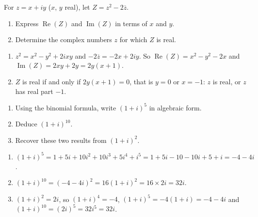 \begin{exercise}
For $z=x+iy$ ($x$, $y$ real), let $Z=z^2-2\overline z$.
\begin{enumerate}
\item Express $\operatorname{Re}(Z)$ and $\operatorname{Im}(Z)$ in terms of $x$ and $y$.
\item Determine the complex numbers $z$ for which $Z$ is real.
\end{enumerate}
\end{exercise}
\begin{solution}
\begin{enumerate}
\item $z^2=x^2-y^2+2ixy$ and $-2\overline z=-2x+2iy$. So $\operatorname{Re}(Z)=x^2-y^2-2x$ and $\operatorname{Im}(Z)=2xy+2y=2y(x+1)$.
\item $Z$ is real if and only if $2y(x+1)=0$, that is $y=0$ or $x=-1$: $z$ is real, or $z$ has real part $-1$.
\end{enumerate}
\end{solution}

\begin{exercise}
\begin{enumerate}
\item Using the binomial formula, write $(1+i)^5$ in algebraic form.
\item Deduce $(1+i)^{10}$.
\item Recover these two results from $(1+i)^2$.
\end{enumerate}
\end{exercise}
\begin{solution}
\begin{enumerate}
\item $(1+i)^5=1+5i+10i^2+10i^3+5i^4+i^5=1+5i-10-10i+5+i=-4-4i$.
\item $(1+i)^{10}=(-4-4i)^2=16(1+i)^2=16\times2i=32i$.
\item $(1+i)^2=2i$, so $(1+i)^4=-4$, $(1+i)^5=-4(1+i)=-4-4i$ and $(1+i)^{10}=(2i)^5=32i^5=32i$.
\end{enumerate}
\end{solution}

